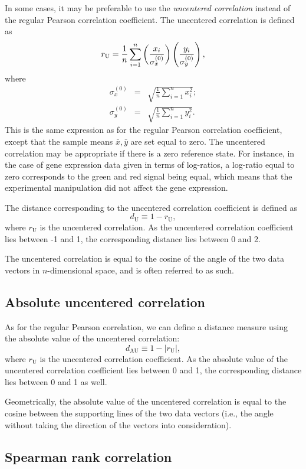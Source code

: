 \documentclass{report}
\begin{document}
In some cases, it may be preferable to use the \emph{uncentered correlation} instead of the regular Pearson correlation coefficient. The uncentered correlation is defined as
$$r_{\textrm U} = \frac{1}{n} \sum_{i=1}^{n} \left(\frac{x_i}{\sigma_x^{(0)}} \right) \left(\frac{y_i}{\sigma_y^{(0)}} \right),$$
where
\begin{eqnarray}
\sigma_x^{(0)} & = & \sqrt{{\frac{1}{n}} \sum_{i=1}^{n}x_i^2}; \nonumber \\
\sigma_y^{(0)} & = & \sqrt{{\frac{1}{n}} \sum_{i=1}^{n}y_i^2}. \nonumber 
\end{eqnarray}
This is the same expression as for the regular Pearson correlation coefficient, except that the sample means
$\bar{x}, \bar{y}$
are set equal to zero. The uncentered correlation may be appropriate if there is a zero reference state. For instance, in the case of gene expression data given in terms of log-ratios, a log-ratio equal to zero corresponds to the green and red signal being equal, which means that the experimental manipulation did not affect the gene expression.

The distance corresponding to the uncentered correlation coefficient is defined as 
$$d_{\mbox{U}} \equiv 1 - r_{\mbox{U}},$$
where
$r_{\mbox{U}}$
is the uncentered correlation.
As the uncentered correlation coefficient lies between -1 and 1, the corresponding distance lies between 0 and 2.

The uncentered correlation is equal to the cosine of the angle of the two data vectors in $n$-dimensional space, and is often referred to as such.

\subsection*{Absolute uncentered correlation}

As for the regular Pearson correlation, we can define a distance measure using the absolute value of the uncentered correlation:
$$d_{\mbox{AU}} \equiv 1 - \left|r_{\mbox{U}}\right|,$$
where
$r_{\mbox{U}}$
is the uncentered correlation coefficient. As the absolute value of the uncentered correlation coefficient lies between 0 and 1, the corresponding distance lies between 0 and 1 as well.

Geometrically, the absolute value of the uncentered correlation is equal to the cosine between the supporting lines of the two data vectors (i.e., the angle without taking the direction of the vectors into consideration).

\subsection*{Spearman rank correlation}
\end{document}
